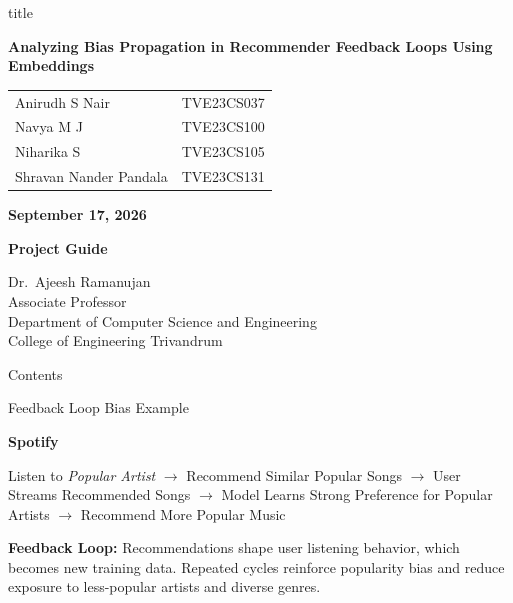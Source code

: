 \documentclass[11pt,aspectratio=43,xcolor=table]{beamer}
\date{September 17, 2026}
\begin{document}
\begin{frame}
\centering

\begin{beamercolorbox}[
    wd=1\textwidth,
    rounded=true,
    shadow=true,
    sep=9pt,
    center
]{title}

\Large\bfseries
Analyzing Bias Propagation in Recommender Feedback Loops Using Embeddings

\end{beamercolorbox}

\vspace{0.5cm}

\small
\begin{tabular}{l l}
Anirudh S Nair & TVE23CS037 \\
Navya M J & TVE23CS100 \\
Niharika S & TVE23CS105 \\
Shravan Nander Pandala & TVE23CS131 \\
\end{tabular}

\vspace{0.4cm}

\normalsize \textbf{September 17, 2026}

\vspace{0.3cm}
\normalsize
\textbf{Project Guide}

\vspace{0.1cm}

\small
Dr.\ Ajeesh Ramanujan\\
Associate Professor\\
Department of Computer Science and Engineering\\
College of Engineering Trivandrum

\end{frame}

\begin{frame}{Contents}
\tableofcontents
\end{frame}

\begin{frame}{Feedback Loop Bias Example}
\scriptsize

\textbf{Spotify}

\bigskip

\centering
Listen to \textit{Popular Artist}
$\rightarrow$
Recommend Similar Popular Songs
$\rightarrow$
User Streams Recommended Songs
$\rightarrow$
Model Learns Strong Preference for Popular Artists
$\rightarrow$
Recommend More Popular Music

\bigskip

\raggedright
\textbf{Feedback Loop:} Recommendations shape user listening behavior, which becomes new training data. Repeated cycles reinforce popularity bias and reduce exposure to less-popular artists and diverse genres.

\end{frame}
\end{document}
